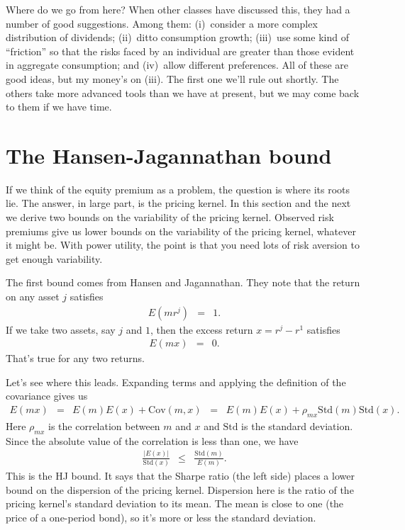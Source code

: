 \documentclass[11pt]{article}
\begin{document}
Where do we go from here?
When other classes have discussed this,
they had a number of good suggestions.
Among them:
(i)~consider a more complex distribution of dividends;
(ii)~ditto consumption growth;
(iii)~use some kind of ``friction'' so that the risks faced by an individual
are greater than those evident in aggregate consumption; and
(iv)~allow different preferences.
All of these are good ideas, but my money's on (iii).
The first one we'll rule out shortly.
The others take more advanced tools than we have at present,
but we may come back to them if we have time.


\section{The Hansen-Jagannathan bound}

If we think of the equity premium as a problem, the question is where its roots lie.
The answer, in large part, is the pricing kernel.
In this section and the next we derive two bounds on the variability of the pricing kernel.
Observed risk premiums give us lower bounds on the variability of the pricing kernel,
whatever it might be.
With power utility, the point is that you need lots of risk aversion to get enough
variability.

The first bound comes from Hansen and Jagannathan.
They note that the return on any asset $j$ satisfies
\begin{eqnarray}
    E \left( m r^j \right) &=& 1 .
    \label{eq:foc}
\end{eqnarray}
If we take two assets, say $j$ and $1$,
then the excess return $x = r^j - r^1$ satisfies
\begin{eqnarray*}
    E \left( m x \right) &=& 0 .
\end{eqnarray*}
That's true for any two returns.

Let's see where this leads.
Expanding terms and applying the definition of the covariance gives us
\begin{eqnarray*}
    E \left( m x \right) &=& E (m) E(x) + \mbox{Cov}(m,x)
            \;\;=\;\; E (m) E(x) + \rho_{mx} \mbox{Std}(m) \mbox{Std}(x) .
\end{eqnarray*}
Here $\rho_{mx}$ is the correlation between $m$ and $x$
and $\mbox{Std}$ is the standard deviation.
Since the absolute value of the correlation is less than one,
we have
\begin{eqnarray}
  \frac{| E(x)|}{ \mbox{Std}(x)} &\leq& \frac{\mbox{Std}(m)}{E(m)} .
  \label{eq:hj-bound}
\end{eqnarray}
This is the HJ bound.
It says that the Sharpe ratio (the left side) places a lower bound
on the dispersion of the pricing kernel.
Dispersion here is the ratio of the pricing kernel's standard deviation to its mean.
The mean is close to one (the price of a one-period bond),
so it's more or less the standard deviation.
\end{document}
